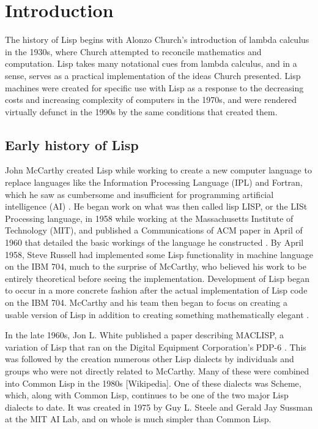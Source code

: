 \documentclass[journal]{IEEEtran}
\begin{document}
%
\IEEEpeerreviewmaketitle



\section{Introduction}
The history of Lisp begins with Alonzo Church's introduction of lambda calculus in the 1930s, where Church attempted to reconcile mathematics and computation. Lisp takes many notational cues from lambda calculus, and in a sense, serves as a practical implementation of the ideas Church presented. Lisp machines were created for specific use with Lisp as a response to the decreasing costs and increasing complexity of computers in the 1970s, and were rendered virtually defunct in the 1990s by the same conditions that created them. 

\subsection{Early history of Lisp}
John McCarthy created Lisp while working to create a new computer language to replace languages like the Information Processing Language (IPL) and Fortran, which he saw as cumbersome and insufficient for programming artificial intelligence (AI) \cite{stoyan}. He began work on what was then called lisp LISP, or the LISt Processing language, in 1958 while working at the Massachusetts Institute of Technology (MIT), and published a Communications of ACM paper in April of 1960 that detailed the basic workings of the language he constructed \cite{stoyan, mccarthy}. By April 1958, Steve Russell had implemented some Lisp functionality in machine language on the IBM 704, much to the surprise of McCarthy, who believed his work to be entirely theoretical before seeing the implementation. Development of Lisp began to occur in a more concrete fashion after the actual implementation of Lisp code on the IBM 704. McCarthy and his team then began to focus on creating a usable version of Lisp in addition to creating something mathematically elegant \cite{stoyan}.

In the late 1960s, Jon L. White published a paper describing MACLISP, a variation of Lisp that ran on the Digital Equipment Corporation's PDP-6 \cite{stoyan}. This was followed by the creation numerous other Lisp dialects by individuals and groups who were not directly related to McCarthy. Many of these were combined into Common Lisp in the 1980s [Wikipedia]. One of these dialects was Scheme, which, along with Common Lisp, continues to be one of the two major Lisp dialects to date. It was created in 1975 by  Guy L. Steele and Gerald Jay Sussman at the MIT AI Lab, and on whole is much simpler than Common Lisp.
\end{document}
